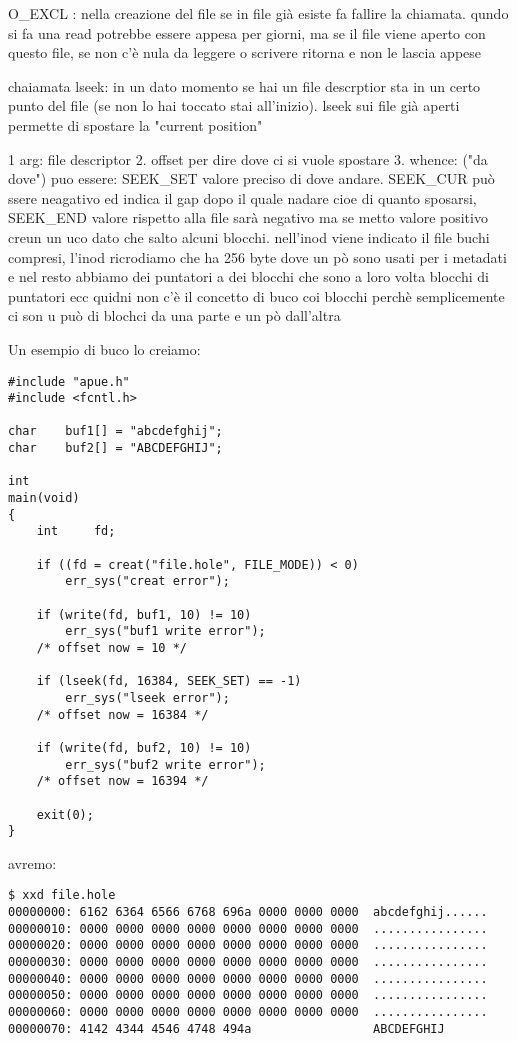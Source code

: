 O\_EXCL : nella creazione del file se in file già esiste fa fallire la chiamata. qundo si fa una read potrebbe essere appesa per giorni, ma se il file viene aperto con questo file, se non c'è nula da leggere o scrivere ritorna e non le lascia appese

chaiamata lseek: in un dato momento se hai un file descrptior sta in un certo punto del file (se non lo hai toccato stai all'inizio). lseek sui file già aperti permette di spostare la "current position" 

1 arg: file descriptor
2. offset per dire dove ci si vuole spostare
3. whence: ("da dove") puo essere: SEEK\_SET valore preciso di dove andare. SEEK\_CUR può ssere neagativo ed indica il gap dopo il quale nadare cioe di quanto sposarsi, SEEK\_END valore rispetto alla file sarà negativo ma se metto valore positivo creun un uco dato che salto alcuni blocchi. nell'inod viene indicato il file buchi compresi, l'inod ricrodiamo che ha 256 byte dove un pò sono usati per i metadati e nel resto abbiamo dei puntatori a dei blocchi che sono a loro volta blocchi di puntatori ecc quidni non c'è il concetto di buco coi blocchi perchè semplicemente ci son u può di blochci da una parte e un pò dall'altra 

Un esempio di buco lo creiamo:

\begin{lstlisting}
#include "apue.h"
#include <fcntl.h>

char	buf1[] = "abcdefghij";
char	buf2[] = "ABCDEFGHIJ";

int
main(void)
{
	int		fd;

	if ((fd = creat("file.hole", FILE_MODE)) < 0)
		err_sys("creat error");

	if (write(fd, buf1, 10) != 10)
		err_sys("buf1 write error");
	/* offset now = 10 */

	if (lseek(fd, 16384, SEEK_SET) == -1)
		err_sys("lseek error");
	/* offset now = 16384 */

	if (write(fd, buf2, 10) != 10)
		err_sys("buf2 write error");
	/* offset now = 16394 */

	exit(0);
}	
\end{lstlisting}

avremo:

\begin{lstlisting}
$ xxd file.hole
00000000: 6162 6364 6566 6768 696a 0000 0000 0000  abcdefghij......
00000010: 0000 0000 0000 0000 0000 0000 0000 0000  ................
00000020: 0000 0000 0000 0000 0000 0000 0000 0000  ................
00000030: 0000 0000 0000 0000 0000 0000 0000 0000  ................
00000040: 0000 0000 0000 0000 0000 0000 0000 0000  ................
00000050: 0000 0000 0000 0000 0000 0000 0000 0000  ................
00000060: 0000 0000 0000 0000 0000 0000 0000 0000  ................
00000070: 4142 4344 4546 4748 494a                 ABCDEFGHIJ
\end{lstlisting}

